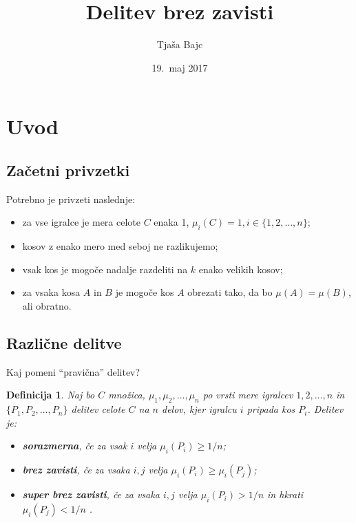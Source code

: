 \documentclass{beamer}
\title{Delitev brez zavisti}
\author{Tjaša Bajc}
\date{19.\ maj 2017}
\newtheorem{definicija}{Definicija}
\begin{document}

\begin{frame}
\titlepage
\end{frame}

\section{Uvod}
\subsection{Začetni privzetki}

\begin{frame}

Potrebno je privzeti naslednje:

\begin{itemize}
\item za vse igralce je mera celote $C$ enaka 1, $\mu_i(C) = 1, i \in \{1, 2, \ldots, n\}$;
\item kosov z enako mero med seboj ne razlikujemo; 
\item vsak kos je mogoče nadalje razdeliti na $k$ enako velikih kosov;
\item za vsaka kosa $A$ in $B$ je mogoče kos $A$ obrezati tako, da bo $\mu(A) = \mu(B)$, ali obratno.							
\end{itemize}

\end{frame}

\subsection{Različne delitve}
\begin{frame}

Kaj pomeni ``pravična'' delitev?

\begin{definicija}
Naj bo $C$ množica, $\mu_1, \mu_2, \ldots, \mu_n$ po vrsti mere igralcev $1, 2, \ldots, n$ in $\{P_1, P_2, \ldots, P_n\}$ delitev celote $C$ na $n$ delov, kjer igralcu $i$ pripada kos $P_i$. Delitev je:

\begin{itemize}
\item \textbf {\em sorazmerna}, če za vsak $i$ velja $\mu_i(P_i) \geq 1/n$;
\item \textbf {\em brez zavisti}, če za vsaka $i, j$ velja $\mu_i(P_i) \geq \mu_i(P_j)$;
\item \textbf {\em super brez zavisti}, če za vsaka $i, j$ velja $\mu_i(P_i) > 1/n$ in hkrati $\mu_i(P_j) < 1/n$ .								
\end{itemize}

\end{definicija}

\end{frame}
\end{document}
